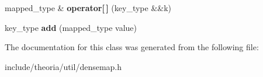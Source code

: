 \begin{DoxyCompactItemize}
\item 
\hypertarget{classtheoria_1_1util_1_1densemap_aa7556f5cea18d37c8ecacd6907742020}{mapped\+\_\+type \& {\bfseries operator\mbox{[}$\,$\mbox{]}} (key\+\_\+type \&\&k)}\label{classtheoria_1_1util_1_1densemap_aa7556f5cea18d37c8ecacd6907742020}

\item 
\hypertarget{classtheoria_1_1util_1_1densemap_a9ca5e32347009b58c2c225ee37cbc0fa}{key\+\_\+type {\bfseries add} (mapped\+\_\+type value)}\label{classtheoria_1_1util_1_1densemap_a9ca5e32347009b58c2c225ee37cbc0fa}

\end{DoxyCompactItemize}


The documentation for this class was generated from the following file\+:\begin{DoxyCompactItemize}
\item 
include/theoria/util/densemap.\+h\end{DoxyCompactItemize}
